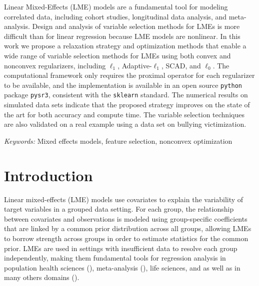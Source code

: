 Linear Mixed-Effects (LME) models are a fundamental tool for modeling correlated data, 
including cohort studies, longitudinal data analysis, and meta-analysis.  Design and analysis of variable selection methods for LMEs is more difficult than for linear regression because LME models are nonlinear. In this work we 
propose a relaxation strategy and optimization methods that enable a wide range of variable selection methods for LMEs using both convex and nonconvex regularizers, including  $\ell_1$, Adaptive-$\ell_1$, SCAD, and $\ell_0$. 
The computational framework only requires the proximal operator for each regularizer to be available, and the implementation is available in an open source \texttt{python} package \texttt{pysr3}, consistent 
with the \texttt{sklearn} standard. 
The numerical results on simulated data sets indicate that the proposed strategy improves on the state of the art for both accuracy and compute time. 
The variable selection techniques are also validated on a real example using a data set on bullying victimization.

{\it Keywords:}  Mixed effects models, feature selection, nonconvex optimization 
%


\section{Introduction}
Linear mixed-effects (LME) models use covariates 
to explain the variability of target variables in a grouped data setting. For each group, the relationship between covariates and observations is modeled 
using group-specific coefficients that are linked by a common prior distribution
across all groups, allowing LMEs to borrow strength across groups
in order to estimate statistics for the common prior. 
LMEs are used in settings with insufficient data to resolve each group independently, making them 
fundamental tools for regression analysis in 
population health sciences (\cite{covid2020modeling,murray2020global}), meta-analysis (\cite{dersimonian1986meta, zheng2021trimmed}), life sciences, and 
as well as in many others domains (\cite{zuur2009mixed}). 

